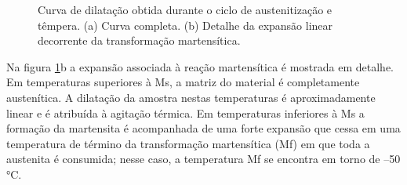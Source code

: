 \begin{figure}
	\vspace{0pt}
	\caption{Curva de dilatação obtida durante o ciclo de austenitização e têmpera. (a) Curva completa. (b) Detalhe da expansão linear decorrente da transformação martensítica.}
	\label{fig:dilMartensita}
\end{figure}

Na figura \ref{fig:dilMartensita}b a expansão associada à reação martensítica é mostrada em detalhe. Em temperaturas superiores à Ms, a matriz do material é completamente austenítica. A dilatação da amostra nestas temperaturas é aproximadamente linear e é atribuída à agitação térmica. Em temperaturas inferiores à Ms a formação da martensita é acompanhada de uma forte expansão que cessa em uma temperatura de término da transformação martensítica (Mf) em que toda a austenita é consumida; nesse caso, a temperatura Mf se encontra em torno de --50 °C.

